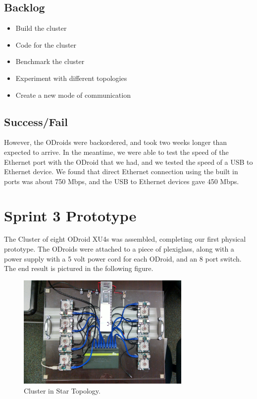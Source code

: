 \subsection{Backlog}

\begin{itemize}
\item Build the cluster
\item Code for the cluster
\item Benchmark the cluster
\item Experiment with different topologies
\item Create a new mode of communication
\end{itemize}

\subsection{Success/Fail} 

However, the ODroids were backordered, and took two weeks longer than expected to arrive. In the meantime, we were able to test the speed of the Ethernet port with the ODroid that we had, and we tested the speed of a USB to Ethernet device. We found that direct Ethernet connection using the built in ports was about 750 Mbps, and the USB to Ethernet devices gave 450 Mbps.

\section{Sprint 3 Prototype}

The Cluster of eight ODroid XU4s was assembled, completing our first physical prototype. The ODroids were attached to a piece of plexiglass, along with a power supply with a 5 volt power cord for each ODroid, and an 8 port switch. The end result is pictured in the following figure. \\

\begin{figure}[tbh]
	\caption{Cluster in Star Topology.}
	\centering
		\includegraphics[width=0.75\textwidth]{IMG_20151201_104751350_HDR.jpg}
\end{figure}

